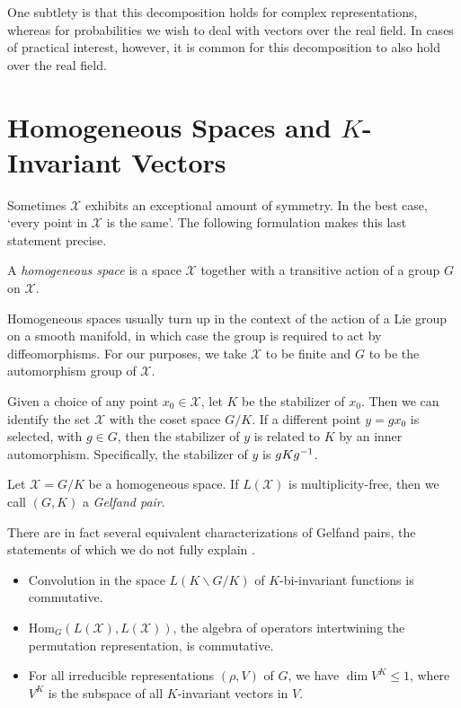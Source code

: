 \documentclass[cclicense]{hmcthesis}
\providecommand*{\xs}{\mathcal X}
\numberwithin{equation}{chapter}
\numberwithin{thmcounter}{chapter}
\begin{document}
    One subtlety is that this decomposition holds for complex representations,
    whereas for probabilities we wish to deal with vectors over the real field.
    In cases of practical interest, however, it is common for this decomposition
    to also hold over the real field.


\section{Homogeneous Spaces and $K$-Invariant Vectors}

    Sometimes $\xs$ exhibits an exceptional amount of symmetry.  In the best
    case, `every point in $\xs$ is the same'.  The following formulation makes
    this last statement precise.
    \begin{definition}
        A \emph{homogeneous space} is a space $\xs$ together with a transitive
        action of a group $G$ on $\xs$.
    \end{definition}
    Homogeneous spaces usually turn up in the context of the action of a Lie
    group on a smooth manifold, in which case the group is required to act by
    diffeomorphisms.  For our purposes, we take $\xs$ to be finite and $G$ to be
    the automorphism group of $\xs$.

    Given a choice of any point $x_0 \in \xs$, let $K$ be the stabilizer of
    $x_0$.  Then we can identify the set $\xs$ with the coset space $G / K$.  If
    a different point $y = g x_0$ is selected, with $g \in G$, then the
    stabilizer of $y$ is related to $K$ by an inner automorphism.  Specifically,
    the stabilizer of $y$ is $g Kg^{-1}$.  
    
    \begin{definition}
        Let $\xs = G / K$ be a homogeneous space.  If $L(\xs)$ is
        multiplicity-free, then we call $(G, K)$ a \emph{Gelfand pair}.
    \end{definition}
    There are in fact several equivalent characterizations of Gelfand pairs,
    the statements of which we do not fully explain \citep{Gelf}.
    \begin{itemize}\noparspace
    \item Convolution in the space $L(K\backslash G/K)$ of $K$-bi-invariant functions
    is commutative.
    \item $\mathrm{Hom}_G(L(\xs), L(\xs))$, the algebra of operators
    intertwining the permutation representation, is commutative.
    \item For all irreducible representations $(\rho, V)$ of $G$, we have
    $\dim V^K \le 1$, where $V^K$ is the subspace of all $K$-invariant
    vectors in $V$. 
    \end{itemize}
\end{document}
